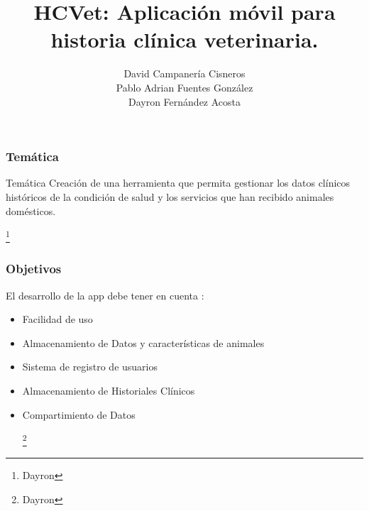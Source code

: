 \documentclass[14pt]{beamer}
\author[Campanería, Fernández, Fuentes]
{David Campanería Cisneros\\Pablo Adrian Fuentes González\\Dayron Fernández Acosta}
\title[Aplicación   HCVet]
{HCVet: Aplicación móvil para historia clínica veterinaria.}
\institute[UH]
{\textbf{Tutores:}\\ José Alejandro Mesejo Chiong\\ José Luis Castañeda Lorenzo}
\begin{document}
\begin{frame}
\titlepage
\end{frame}



\begin{frame}
\frametitle{Temática}
\begin{block}{Temática}
Creación de una herramienta que permita gestionar los datos clínicos históricos de la condición de salud y los servicios que han recibido animales domésticos.

\end{block}

\footnote{Dayron}
\end{frame}


\begin{frame}
\frametitle{Objetivos}
El desarrollo de la app debe tener en cuenta :
\begin{itemize}
\item Facilidad de uso
\item Almacenamiento de Datos y características de animales
\item Sistema de registro de usuarios
\item Almacenamiento de Historiales Clínicos
\item Compartimiento de Datos 


\footnote{Dayron}
\end{itemize}
\end{frame}
\end{document}
